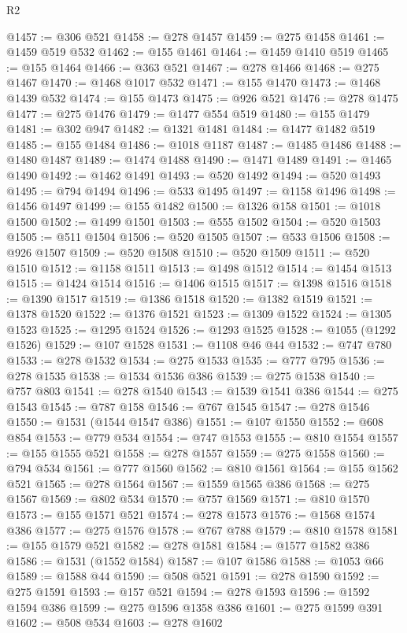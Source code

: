 \begin{lexlean}{R2}
\begin{coremodule}
@1457 := @306 @521
@1458 := @278 @1457
@1459 := @275 @1458
@1461 := @1459 @519 @532
@1462 := @155 @1461
@1464 := @1459 @1410 @519
@1465 := @155 @1464
@1466 := @363 @521
@1467 := @278 @1466
@1468 := @275 @1467
@1470 := @1468 @1017 @532
@1471 := @155 @1470
@1473 := @1468 @1439 @532
@1474 := @155 @1473
@1475 := @926 @521
@1476 := @278 @1475
@1477 := @275 @1476
@1479 := @1477 @554 @519
@1480 := @155 @1479
@1481 := @302 @947
@1482 := @1321 @1481
@1484 := @1477 @1482 @519
@1485 := @155 @1484
@1486 := @1018 @1187
@1487 := @1485 @1486
@1488 := @1480 @1487
@1489 := @1474 @1488
@1490 := @1471 @1489
@1491 := @1465 @1490
@1492 := @1462 @1491
@1493 := @520 @1492
@1494 := @520 @1493
@1495 := @794 @1494
@1496 := @533 @1495
@1497 := @1158 @1496
@1498 := @1456 @1497
@1499 := @155 @1482
@1500 := @1326 @158
@1501 := @1018 @1500
@1502 := @1499 @1501
@1503 := @555 @1502
@1504 := @520 @1503
@1505 := @511 @1504
@1506 := @520 @1505
@1507 := @533 @1506
@1508 := @926 @1507
@1509 := @520 @1508
@1510 := @520 @1509
@1511 := @520 @1510
@1512 := @1158 @1511
@1513 := @1498 @1512
@1514 := @1454 @1513
@1515 := @1424 @1514
@1516 := @1406 @1515
@1517 := @1398 @1516
@1518 := @1390 @1517
@1519 := @1386 @1518
@1520 := @1382 @1519
@1521 := @1378 @1520
@1522 := @1376 @1521
@1523 := @1309 @1522
@1524 := @1305 @1523
@1525 := @1295 @1524
@1526 := @1293 @1525
@1528 := @1055 (@1292 @1526)
@1529 := @107 @1528
@1531 := @1108 @46 @44
@1532 := @747 @780
@1533 := @278 @1532
@1534 := @275 @1533
@1535 := @777 @795
@1536 := @278 @1535
@1538 := @1534 @1536 @386
@1539 := @275 @1538
@1540 := @757 @803
@1541 := @278 @1540
@1543 := @1539 @1541 @386
@1544 := @275 @1543
@1545 := @787 @158
@1546 := @767 @1545
@1547 := @278 @1546
@1550 := @1531 (@1544 @1547 @386)
@1551 := @107 @1550
@1552 := @608 @854
@1553 := @779 @534
@1554 := @747 @1553
@1555 := @810 @1554
@1557 := @155 @1555 @521
@1558 := @278 @1557
@1559 := @275 @1558
@1560 := @794 @534
@1561 := @777 @1560
@1562 := @810 @1561
@1564 := @155 @1562 @521
@1565 := @278 @1564
@1567 := @1559 @1565 @386
@1568 := @275 @1567
@1569 := @802 @534
@1570 := @757 @1569
@1571 := @810 @1570
@1573 := @155 @1571 @521
@1574 := @278 @1573
@1576 := @1568 @1574 @386
@1577 := @275 @1576
@1578 := @767 @788
@1579 := @810 @1578
@1581 := @155 @1579 @521
@1582 := @278 @1581
@1584 := @1577 @1582 @386
@1586 := @1531 (@1552 @1584)
@1587 := @107 @1586
@1588 := @1053 @66
@1589 := @1588 @44
@1590 := @508 @521
@1591 := @278 @1590
@1592 := @275 @1591
@1593 := @157 @521
@1594 := @278 @1593
@1596 := @1592 @1594 @386
@1599 := @275 @1596 @1358 @386
@1601 := @275 @1599 @391
@1602 := @508 @534
@1603 := @278 @1602

\end{coremodule}
\end{lexlean}
